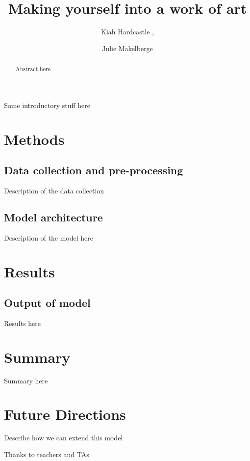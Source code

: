 \documentclass{pnastwo2}
\begin{document}
\title{Making yourself into a work of art}

\author{Kiah Hardcastle ,
\and Julie Makelberge}


\maketitle

\begin{article}
\begin{abstract}

Abstract here

\end{abstract}

 Some introductory stuff here

\section{Methods}

\subsection{Data collection and pre-processing}

Description of the data collection

\subsection{Model architecture}

Description of the model here 

\section{Results}

\subsection{Output of model}

Results here


\section{Summary}

Summary here

\section{Future Directions}

Describe how we can extend this model

\begin{acknowledgments}
Thanks to teachers and TAs
\end{acknowledgments}




\end{article}
\end{document}
